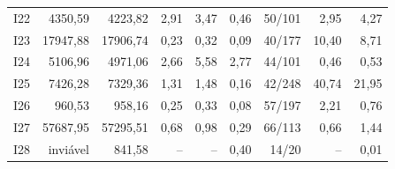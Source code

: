 \begin{tabular}{lrrrrrrrr}
I22 & 4350,59 & 4223,82 & 2,91 & 3,47 & 0,46 & 50/101 & 2,95 & 4,27 \\
I23 & 17947,88 & 17906,74 & 0,23 & 0,32 & 0,09 & 40/177 & 10,40 & 8,71 \\
I24 & 5106,96 & 4971,06 & 2,66 & 5,58 & 2,77 & 44/101 & 0,46 & 0,53 \\
I25 & 7426,28 & 7329,36 & 1,31 & 1,48 & 0,16 & 42/248 & 40,74 & 21,95 \\
I26 & 960,53 & 958,16 & 0,25 & 0,33 & 0,08 & 57/197 & 2,21 & 0,76 \\
I27 & 57687,95 & 57295,51 & 0,68 & 0,98 & 0,29 & 66/113 & 0,66 & 1,44 \\
I28 & inviável & 841,58 & -- & -- & 0,40 & 14/20 & -- & 0,01 \\
\hline
\end{tabular}
